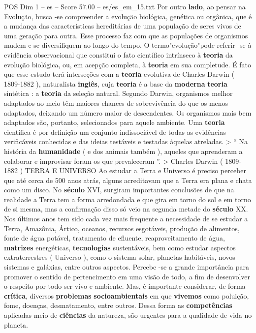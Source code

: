 \begin{textsample}{POS Dim 1 – es – Score 57.00 – es/es\_em\_15.txt}
Por outro \textbf{lado}, ao pensar na Evolução, busca -se compreender a evolução biológica, genética ou orgânica, que é a mudança das características hereditárias de uma população de seres vivos de uma geração para outra.
Esse processo faz com que as populações de organismos mudem e se diversifiquem ao longo do tempo.
O termo"evolução"pode referir -se à evidência observacional que constitui o fato científico intrínseco à \textbf{teoria} da evolução biológica, ou, em acepção completa, à \textbf{teoria} em sua completude.
É fato que esse estudo terá interseções com a \textbf{teoria} evolutiva de Charles Darwin ( 1809-1882 ), naturalista \textbf{inglês}, cuja \textbf{teoria} é a base da \textbf{moderna} \textbf{teoria} sintética : a \textbf{teoria} da seleção natural.
Segundo Darwin, organismos melhor adaptados ao meio têm maiores chances de sobrevivência do que os menos adaptados, deixando um número maior de descendentes.
Os organismos mais bem adaptados são, portanto, selecionados para aquele ambiente.
Uma \textbf{teoria} científica é por definição um conjunto indissociável de todas as evidências verificáveis conhecidas e das ideias testáveis e testadas àquelas atreladas. > “ Na história da \textbf{humanidade} ( e dos animais também ), aqueles que aprenderam a colaborar e improvisar foram os que prevaleceram ”. > Charles Darwin ( 1809-1882 ) TERRA E UNIVERSO Ao estudar a Terra e Universo é preciso perceber que até cerca de 500 anos atrás, alguns acreditavam que a Terra era plana e chata como um disco.
No \textbf{século} XVI, surgiram importantes conclusões de que na realidade a Terra tem a forma arredondada e que gira em torno do sol e em torno de si mesma, mas a confirmação disso só veio na segunda metade do \textbf{século} XX.
Nos últimos anos tem sido cada vez mais frequente a necessidade de se estudar a Terra, Amazônia, Ártico, oceanos, recursos esgotáveis, produção de alimentos, fonte de água potável, tratamento de efluente, reaproveitamento de água, \textbf{matrizes} energéticas, \textbf{tecnologias} sustentáveis, bem como estudar aspectos extraterrestres ( Universo ), como o sistema solar, planetas habitáveis, novos sistemas e galáxias, entre outros aspectos.
Percebe -se a grande importância para promover o sentido de pertencimento em uma visão de todo, a fim de desenvolver o respeito por todo ser vivo e ambiente.
Mas, é importante considerar, de forma \textbf{crítica}, diversos \textbf{problemas} \textbf{socioambientais} em que \textbf{vivemos} como poluição, fome, doenças, desmatamento, entre outros.
Dessa forma as \textbf{competências} aplicadas meio de \textbf{ciências} da natureza, são urgentes para a qualidade de vida no planeta.

\end{textsample}
